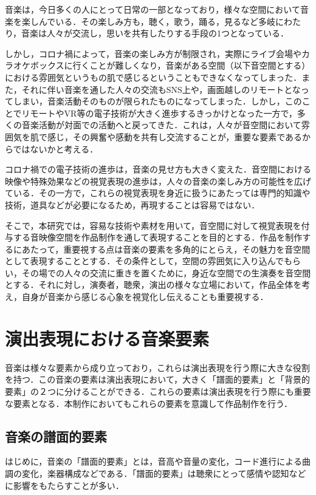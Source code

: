 \documentclass[submit,techrep,noauthor]{ipsj}
\begin{document}
音楽は，今日多くの人にとって日常の一部となっており，様々な空間において音楽を楽しんでいる．その楽しみ方も，聴く，歌う，踊る，見るなど多岐にわたり，音楽は人々が交流し，思いを共有したりする手段の1つとなっている．

しかし，コロナ禍によって，音楽の楽しみ方が制限され，実際にライブ会場やカラオケボックスに行くことが難しくなり，音楽がある空間（以下音空間とする）における雰囲気というもの肌で感じるということもできなくなってしまった．また，それに伴い音楽を通した人々の交流もSNS上や，画面越しのリモートとなってしまい，音楽活動そのものが限られたものになってしまった．しかし，このことでリモートやVR等の電子技術が大きく進歩するきっかけとなった一方で，多くの音楽活動が対面での活動へと戻ってきた．これは，人々が音空間において雰囲気を肌で感じ，その興奮や感動を共有し交流することが，重要な要素であるからではないかと考える．

コロナ禍での電子技術の進歩は，音楽の見せ方も大きく変えた．音空間における映像や特殊効果などの視覚表現の進歩は，人々の音楽の楽しみ方の可能性を広げている．その一方で，これらの視覚表現を身近に扱うにあたっては専門的知識や技術，道具などが必要になるため，再現することは容易ではない．

そこで，本研究では，容易な技術や素材を用いて，音空間に対して視覚表現を付与する音映像空間を作品制作を通して表現することを目的とする．作品を制作するにあたって，重要視する点は音楽の要素を多角的にとらえ，その魅力を音空間として表現することとする．その条件として，空間の雰囲気に入り込んでもらい，その場での人々の交流に重きを置くために，身近な空間での生演奏を音空間とする．それに対し，演奏者，聴衆，演出の様々な立場において，作品全体を考え，自身が音楽から感じる心象を視覚化し伝えることも重要視する．


\section{演出表現における音楽要素}


音楽は様々な要素から成り立っており，これらは演出表現を行う際に大きな役割を持つ．この音楽の要素は演出表現において，大きく「譜面的要素」と「背景的要素」の２つに分けることができる．これらの要素は演出表現を行う際にも重要な要素となる．本制作においてもこれらの要素を意識して作品制作を行う．
\subsection{音楽の譜面的要素}
はじめに，音楽の「譜面的要素」とは，音高や音量の変化，コード進行による曲調の変化，楽器構成などである．「譜面的要素」は聴衆にとって感情や認知などに影響をもたらすことが多い．
\end{document}
